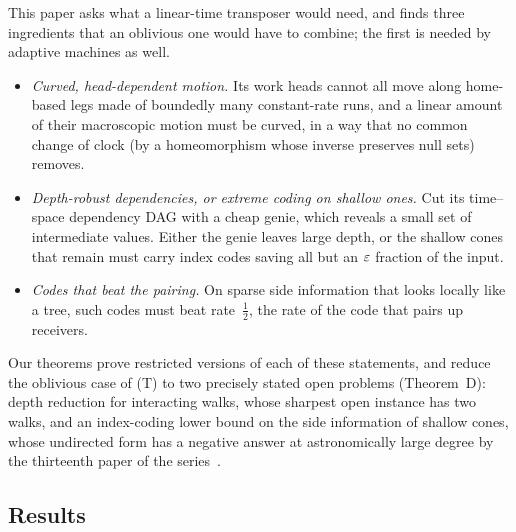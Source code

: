 This paper asks what a linear-time transposer would need, and finds three ingredients that an oblivious one would have to
combine; the first is needed by adaptive machines as well.
\begin{itemize}[leftmargin=2em]
\item \emph{Curved, head-dependent motion.} Its work heads cannot all move along home-based legs made of boundedly many
constant-rate runs, and a linear amount of their macroscopic motion must be curved, in a way that no common change of
clock (by a homeomorphism whose inverse preserves null sets) removes.
\item \emph{Depth-robust dependencies, or extreme coding on shallow ones.} Cut its time--space dependency DAG with a cheap
genie, which reveals a small set of intermediate values. Either the genie leaves large depth, or the shallow cones that remain must carry index codes saving all but an
$\varepsilon$ fraction of the input.
\item \emph{Codes that beat the pairing.} On sparse side information that looks locally like a tree, such codes must beat
rate~$\tfrac12$, the rate of the code that pairs up receivers.
\end{itemize}
Our theorems prove restricted versions of each of these statements, and reduce the oblivious case of (T) to two
precisely stated open problems (Theorem~D): depth reduction for interacting walks, whose sharpest open instance has two
walks, and an index-coding lower bound on the side information of shallow cones, whose undirected form has a negative
answer at astronomically large degree by the thirteenth paper of the series~\cite[Corollary~U]{StorageCodes2026}.

\subsection{Results}

